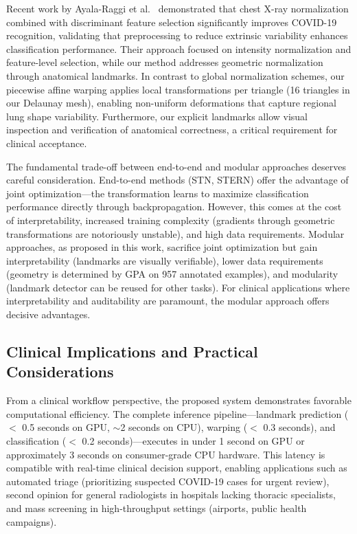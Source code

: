 \documentclass[applsci,article,submit,pdftex,moreauthors]{Definitions/mdpi}
\begin{document}
Recent work by Ayala-Raggi et al.~\cite{ayala2023synergizing} demonstrated that chest X-ray normalization combined with discriminant feature selection significantly improves COVID-19 recognition, validating that preprocessing to reduce extrinsic variability enhances classification performance. Their approach focused on intensity normalization and feature-level selection, while our method addresses geometric normalization through anatomical landmarks. In contrast to global normalization schemes, our piecewise affine warping applies local transformations per triangle (16 triangles in our Delaunay mesh), enabling non-uniform deformations that capture regional lung shape variability. Furthermore, our explicit landmarks allow visual inspection and verification of anatomical correctness, a critical requirement for clinical acceptance.

The fundamental trade-off between end-to-end and modular approaches deserves careful consideration. End-to-end methods (STN, STERN) offer the advantage of joint optimization---the transformation learns to maximize classification performance directly through backpropagation. However, this comes at the cost of interpretability, increased training complexity (gradients through geometric transformations are notoriously unstable), and high data requirements. Modular approaches, as proposed in this work, sacrifice joint optimization but gain interpretability (landmarks are visually verifiable), lower data requirements (geometry is determined by GPA on 957 annotated examples), and modularity (landmark detector can be reused for other tasks). For clinical applications where interpretability and auditability are paramount, the modular approach offers decisive advantages.

\subsection{Clinical Implications and Practical Considerations}

From a clinical workflow perspective, the proposed system demonstrates favorable computational efficiency. The complete inference pipeline---landmark prediction ($<$ 0.5 seconds on GPU, $\sim$2 seconds on CPU), warping ($<$ 0.3 seconds), and classification ($<$ 0.2 seconds)---executes in under 1 second on GPU or approximately 3 seconds on consumer-grade CPU hardware. This latency is compatible with real-time clinical decision support, enabling applications such as automated triage (prioritizing suspected COVID-19 cases for urgent review), second opinion for general radiologists in hospitals lacking thoracic specialists, and mass screening in high-throughput settings (airports, public health campaigns).
\end{document}
